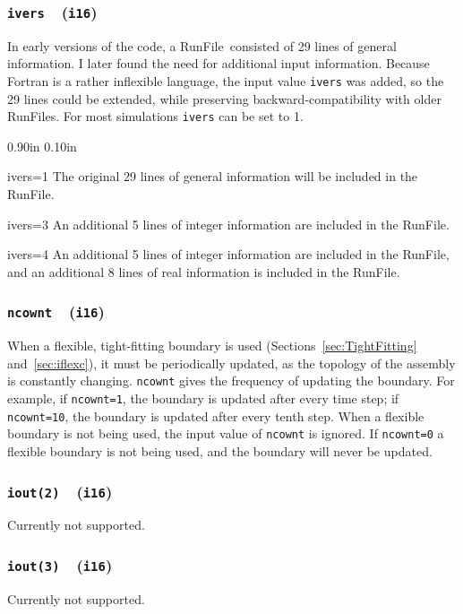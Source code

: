 \documentclass[letterpaper,11pt]{article}
\newcommand{\Var}[2]{\texttt{#1}\ \  (\texttt{#2})}
\newcommand{\RunFile}{\textsf{RunFile}}
\newlength{\Labelwidth}
\newcommand{\Entrylabel}[1]{\makebox[\Labelwidth][r]{\texttt{#1}}}
\newenvironment{Options}
{\begin{list}{}{%
\renewcommand{\makelabel}{\Entrylabel}%
\setlength{\leftmargin} {0.90in}%
\setlength{\rightmargin}{0.00in}%
\setlength{\labelsep}   {0.10in}%
\setlength{\labelwidth} {\Labelwidth}%
}}
{\end{list}}
\begin{document}
\subsubsection[\texttt{ivers}]{\Var{ivers}{i16}}\label{sec:ivers}
In early versions of the code, a \RunFile\ consisted of 29 lines of
general information.  I later found the need for additional input information.
Because Fortran is a rather inflexible language, the input value
\texttt{ivers} was added, so the 29 lines could be extended, while preserving
backward-compatibility with older {\RunFile}s.
For most simulations \texttt{ivers} can be set to 1.
\begin{Options}
\item[ivers=1]
The original 29 lines of general information will be included in the 
\RunFile.
\item[ivers=3]
An additional 5 lines of integer information are included in the \RunFile.
\item[ivers=4]
An additional 5 lines of integer information are included in the \RunFile,
and
an additional 8 lines of real information is included in the \RunFile.
\end{Options}
\subsubsection[\texttt{ncownt}]{\Var{ncownt}{i16}}
When a flexible, tight-fitting boundary is used 
(Sections~\ref{sec:TightFitting} and~\ref{sec:iflexc}), it must be periodically
updated, as the topology of the assembly is constantly changing.  
\texttt{ncownt} gives the frequency of updating the boundary.
For example, if \texttt{ncownt=1}, the boundary is updated after
every time step; if \texttt{ncownt=10},  the boundary is updated after
every tenth step.
When a flexible boundary is not being used, the input value of
\texttt{ncownt} is ignored.
If \texttt{ncownt=0} a flexible boundary is not being used, 
and the boundary will never be updated.
%
\subsubsection[\texttt{iout(2)}]{\Var{iout(2)}{i16}}
Currently not supported.
\subsubsection[\texttt{iout(3)}]{\Var{iout(3)}{i16}}
Currently not supported.
\end{document}
